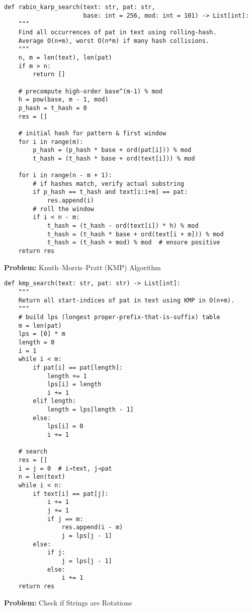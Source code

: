 \begin{verbatim}
def rabin_karp_search(text: str, pat: str,
                      base: int = 256, mod: int = 101) -> List[int]:
    """
    Find all occurrences of pat in text using rolling‐hash.
    Average O(n+m), worst O(n*m) if many hash collisions.
    """
    n, m = len(text), len(pat)
    if m > n:
        return []

    # precompute high-order base^(m-1) % mod
    h = pow(base, m - 1, mod)
    p_hash = t_hash = 0
    res = []

    # initial hash for pattern & first window
    for i in range(m):
        p_hash = (p_hash * base + ord(pat[i])) % mod
        t_hash = (t_hash * base + ord(text[i])) % mod

    for i in range(n - m + 1):
        # if hashes match, verify actual substring
        if p_hash == t_hash and text[i:i+m] == pat:
            res.append(i)
        # roll the window
        if i < n - m:
            t_hash = (t_hash - ord(text[i]) * h) % mod
            t_hash = (t_hash * base + ord(text[i + m])) % mod
            t_hash = (t_hash + mod) % mod  # ensure positive
    return res
\end{verbatim}
\noindent\textbf{Problem:} Knuth–Morris–Pratt (KMP) Algorithm
\begin{verbatim}
def kmp_search(text: str, pat: str) -> List[int]:
    """
    Return all start-indices of pat in text using KMP in O(n+m).
    """
    # build lps (longest proper‐prefix‐that‐is‐suffix) table
    m = len(pat)
    lps = [0] * m
    length = 0
    i = 1
    while i < m:
        if pat[i] == pat[length]:
            length += 1
            lps[i] = length
            i += 1
        elif length:
            length = lps[length - 1]
        else:
            lps[i] = 0
            i += 1

    # search
    res = []
    i = j = 0  # i→text, j→pat
    n = len(text)
    while i < n:
        if text[i] == pat[j]:
            i += 1
            j += 1
            if j == m:
                res.append(i - m)
                j = lps[j - 1]
        else:
            if j:
                j = lps[j - 1]
            else:
                i += 1
    return res
\end{verbatim}
\noindent\textbf{Problem:} Check if Strings are Rotations

